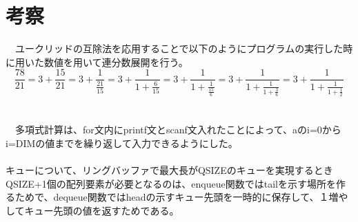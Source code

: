 \documentclass[a4j,titlepage]{jarticle}
\begin{document}


\section{考察}
　ユークリッドの互除法を応用することで以下のようにプログラムの実行した時に用いた数値を用いて連分数展開を行う。
 \[
  \frac{78}{21} = 3+\frac{15}{21}=3+\frac{1}{\frac{21}{15}}=3+\frac{1}{1+\frac{6}{15}} =3+\frac{1}{1+\frac{1}{\frac{15}{6}}}=3+\frac{1}{1+\frac{1}{1+\frac{3}{6}}}=3+\frac{1}{1+\frac{1}{1+\frac{1}{2}}}
\]
 \\
 \\
 　多項式計算は、for文内にprintf文とscanf文入れたことによって、aのi=0からi=DIMの値までを繰り返して入力できるようにした。
\\
\\

キューについて、リングバッファで最大長がQSIZEのキューを実現するときQSIZE+1個の配列要素が必要となるのは、enqueue関数ではtailを示す場所を作るためで、dequeue関数ではheadの示すキュー先頭を一時的に保存して、１増やしてキュー先頭の値を返すためである。
 
\end{document}
